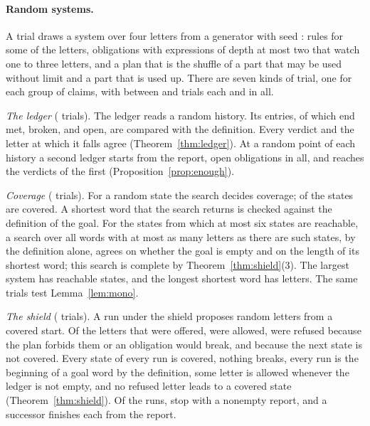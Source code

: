 \documentclass[acmsmall,nonacm,screen]{acmart}
\newcommand{\claim}[2]{#2}
\begin{document}
\paragraph{Random systems.} A trial draws a system over four letters from a generator with
seed \exSeed{}: rules for some of the letters, obligations with expressions of depth at
most two that watch one to three letters, and a plan that is the shuffle of a part that may
be used without limit and a part that is used up. There are seven kinds of trial, one for
each group of claims, with between \exTrialsShield{} and \exTrialsLedger{} trials each and
\exTrials{} in all.

\emph{The ledger} (\exTrialsLedger{} trials). The ledger reads a random history. Its
\exObligations{} entries, of which \exMet{} end met, \exBroken{} broken, and \exOpen{} open,
are compared with the definition. \claim{ledger-agrees}{Every verdict and the letter at
which it falls agree (Theorem~\ref{thm:ledger}).} At a random point of each history a second
ledger starts from the report, \exHanded{} open obligations in all, and reaches the
verdicts of the first (Proposition~\ref{prop:enough}).

\emph{Coverage} (\exTrialsCover{} trials). For a random state the search decides coverage;
\exCovered{} of the \exStates{} states are covered. A shortest word that the search returns
is checked against the definition of the goal. \claim{cover-agrees}{For the \exSmall{}
states from which at most six states are reachable, a search over all words with at most as many
letters as there are such states, by the definition alone, agrees on whether the goal is empty and on the length of
its shortest word}; this search is complete by Theorem~\ref{thm:shield}(3). The largest
system has \exLargest{} reachable states, and the longest shortest word has \exLongest{}
letters. The same trials test Lemma~\ref{lem:mono}.

\emph{The shield} (\exTrialsShield{} trials). A run under the shield proposes random letters
from a covered start. Of the \exOffered{} letters that were offered, \exAllowed{} were
allowed, \exRefusedPlan{} were refused because the plan forbids them or an obligation would
break, and \exRefusedCover{} because the next state is not covered.
\claim{shield-holds}{Every state of every run is covered, nothing breaks, every run is the
beginning of a goal word by the definition, some letter is allowed whenever the ledger is
not empty, and no refused letter leads to a covered state (Theorem~\ref{thm:shield}).} Of
the \exRuns{} runs, \exStopsReport{} stop with a nonempty report, and a successor finishes
each from the report.
\end{document}

